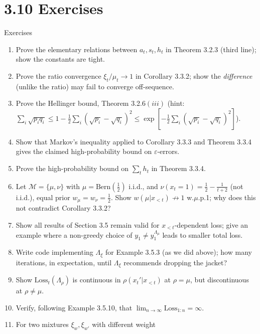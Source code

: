 \documentclass[aspectratio=169,10pt]{beamer}
\newcommand{\Mcal}{\mathcal{M}}
\newcommand{\Loss}{\mathrm{Loss}}
\begin{document}
\section{3.10 Exercises}

\begin{frame}[allowframebreaks]{Exercises}
  \begin{enumerate}\small
    \item[1.] Prove the elementary relations between $a_t,s_t,h_t$ in
      Theorem 3.2.3 (third line); show the constants are tight.
    \item[2.] Prove the ratio convergence $\xi_t/\mu_t\to 1$ in
      Corollary 3.3.2; show the \emph{difference} (unlike the ratio) may
      fail to converge off-sequence.
    \item[3.] Prove the Hellinger bound, Theorem 3.2.6$(iii)$ (hint:
      $\sum_i\sqrt{p_iq_i}\le 1-\tfrac12\sum_i(\sqrt{p_i}-\sqrt{q_i})^2\le
      \exp[-\tfrac12\sum_i(\sqrt{p_i}-\sqrt{q_i})^2]$).
    \item[4.] Show that Markov's inequality applied to Corollary 3.3.3 and
      Theorem 3.3.4 gives the claimed high-probability bound on
      $\varepsilon$-errors.
    \item[5.] Prove the high-probability bound on $\sum_t h_t$ in
      Theorem 3.3.4.
    \item[6.] Let $\Mcal=\{\mu,\nu\}$ with $\mu=\text{Bern}(\tfrac12)$ i.i.d.,
      and $\nu(x_t{=}1)=\tfrac12-\tfrac{1}{t+2}$ (not i.i.d.), equal prior
      $w_\mu=w_\nu=\tfrac12$. Show $w(\mu|x_{<t})\not\to 1$ w.$\mu$.p.1; why
      does this not contradict Corollary 3.3.2?
    \item[7.] Show all results of Section 3.5 remain valid for
      $x_{<t}$-dependent loss; give an example where a non-greedy choice
      of $y_1\ne y_1^{\Lambda_\mu}$ leads to smaller total loss.
    \item[8.] Write code implementing $\Lambda_\xi$ for Example 3.5.3 (as
      we did above); how many iterations, in expectation, until $\Lambda_\xi$
      recommends dropping the jacket?
    \item[9.] Show $\Loss_t(\Lambda_\rho)$ is continuous in $\rho(x_t'|x_{<t})$
      at $\rho=\mu$, but discontinuous at $\rho\ne\mu$.
    \item[10.] Verify, following Example 3.5.10, that $\lim_{n\to\infty}\Loss_{1:n}=\infty$.
    \item[11.] For two mixtures $\xi_w,\xi_{w'}$ with different weight

\end{enumerate}
\end{frame}
\end{document}
